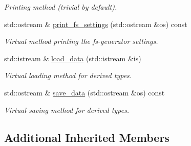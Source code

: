 \begin{DoxyCompactItemize}
\begin{DoxyCompactList}\small\item\em Printing method (trivial by default). \end{DoxyCompactList}\item 
\hypertarget{a00446_a8f6ff3a7679066e2fd934b7df1a3021d}{std\-::ostream \& \hyperlink{a00446_a8f6ff3a7679066e2fd934b7df1a3021d}{print\-\_\-fs\-\_\-settings} (std\-::ostream \&os) const }\label{a00446_a8f6ff3a7679066e2fd934b7df1a3021d}

\begin{DoxyCompactList}\small\item\em Virtual method printing the fs-\/generator settings. \end{DoxyCompactList}\item 
\hypertarget{a00446_aa47039c6069a04cb560300a608227196}{std\-::istream \& \hyperlink{a00446_aa47039c6069a04cb560300a608227196}{load\-\_\-data} (std\-::istream \&is)}\label{a00446_aa47039c6069a04cb560300a608227196}

\begin{DoxyCompactList}\small\item\em Virtual loading method for derived types. \end{DoxyCompactList}\item 
\hypertarget{a00446_a252ecd0b58cbb963172e5caae7e85b73}{std\-::ostream \& \hyperlink{a00446_a252ecd0b58cbb963172e5caae7e85b73}{save\-\_\-data} (std\-::ostream \&os) const }\label{a00446_a252ecd0b58cbb963172e5caae7e85b73}

\begin{DoxyCompactList}\small\item\em Virtual saving method for derived types. \end{DoxyCompactList}\end{DoxyCompactItemize}
\subsection*{Additional Inherited Members}



